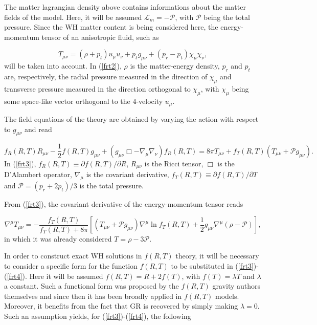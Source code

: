 \documentclass[aps,preprint,onecolumn,11pt,showkeys]{revtex4}%
\begin{document}
The matter lagrangian density above contains informations about the matter
fields of the model. Here, it will be assumed $\mathcal{L}_{m}=-\mathcal{P}$,
with $\mathcal{P}$ being the total pressure. Since the WH matter content is
being considered here, the energy-momentum tensor of an anisotropic fluid,
such as \cite{morris/1988}%

\begin{equation}
\label{frt2}T_{\mu\nu}=(\rho+p_{t})u_{\mu}u_{\nu}+p_{t}g_{\mu\nu}+(p_{r}%
-p_{t})\chi_{\mu}\chi_{\nu},
\end{equation}
will be taken into account. In (\ref{frt2}), $\rho$ is the matter-energy
density, $p_{r}$ and $p_{t}$ are, respectively, the radial pressure measured
in the direction of $\chi_{\mu}$ and transverse pressure measured in the
direction orthogonal to $\chi_{\mu}$, with $\chi_{\mu}$ being some space-like
vector orthogonal to the $4$-velocity $u_{\mu}$.

The field equations of the theory are obtained by varying the action with
respect to $g_{\mu\nu}$ and read%

\begin{equation}
\label{frt3}f_{R}(R,T)R_{\mu\nu}-\frac{1}{2}f(R,T)g_{\mu\nu}+(g_{\mu\nu}%
\Box-\nabla_{\mu}\nabla_{\nu})f_{R}(R,T)=8\pi T_{\mu\nu}+f_{T}(R,T)(T_{\mu\nu
}+\mathcal{P}g_{\mu\nu}).
\end{equation}
In (\ref{frt3}), $f_{R}(R,T)\equiv\partial f(R,T)/\partial R$, $R_{\mu\nu}$ is
the Ricci tensor, $\Box$ is the D'Alambert operator, $\nabla_{\mu}$ is the
covariant derivative, $f_{T}(R,T)\equiv\partial f(R,T)/\partial T$ and
$\mathcal{P}=(p_{r}+2p_{t})/3$ is the total pressure.

From (\ref{frt3}), the covariant derivative of the energy-momentum tensor reads%

\begin{equation}
\label{frt4}\nabla^{\mu}T_{\mu\nu}=-\frac{f_{T}(R,T)}{f_{T}(R,T)+8\pi}\left[
(T_{\mu\nu}+\mathcal{P}g_{\mu\nu})\nabla^{\mu}\ln f_{T}(R,T)+\frac{1}{2}%
g_{\mu\nu}\nabla^{\mu}(\rho-\mathcal{P})\right]  ,
\end{equation}
in which it was already considered $T=\rho-3\mathcal{P}$.

In order to construct exact WH solutions in $f(R,T)$ theory, it will be
necessary to consider a specific form for the function $f(R,T)$ to be
substituted in (\ref{frt3})-(\ref{frt4}). Here it will be assumed
$f(R,T)=R+2f(T)$, with $f(T)=\lambda T$ and $\lambda$ a constant. Such a functional form was
proposed by the $f(R,T)$ gravity authors themselves \cite{harko/2011} and
since then it has been broadly applied in $f(R,T)$ models. Moreover, it
benefits from the fact that GR is recovered by simply making $\lambda=0$. Such
an assumption yields, for (\ref{frt3})-(\ref{frt4}), the following%
\end{document}
